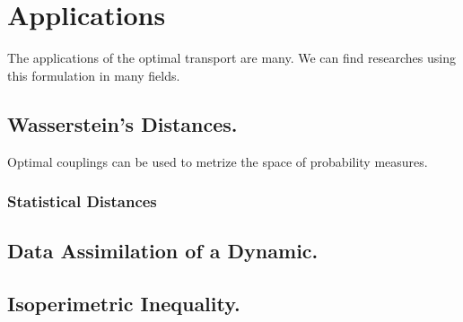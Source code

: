 \chapter{Applications}
The applications of the optimal transport are many. We can find researches using this formulation in many fields.
\section{Wasserstein's Distances.}
Optimal couplings can be used to metrize the space of probability measures.


\subsection{Statistical Distances}

\section{Data Assimilation of a Dynamic.}
\section{Isoperimetric Inequality.}
